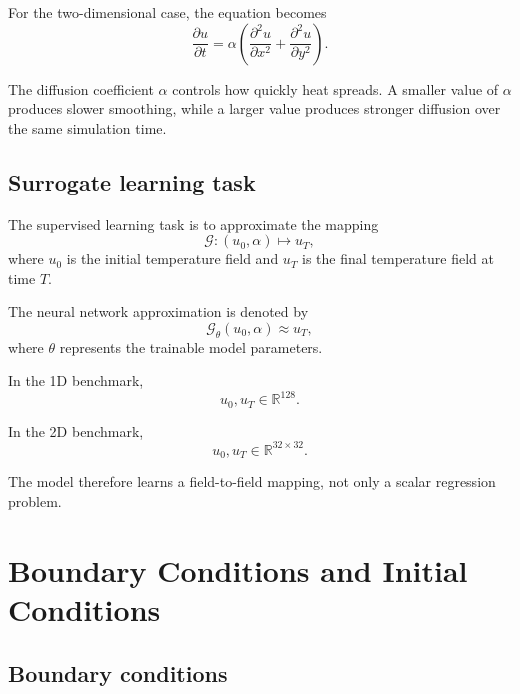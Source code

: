 \documentclass[11pt,a4paper]{article}
\begin{document}
For the two-dimensional case, the equation becomes
\begin{equation}
    \frac{\partial u}{\partial t}
    =
    \alpha
    \left(
    \frac{\partial^2 u}{\partial x^2}
    +
    \frac{\partial^2 u}{\partial y^2}
    \right).
    \label{eq:heat_2d}
\end{equation}

The diffusion coefficient \(\alpha\) controls how quickly heat spreads. A smaller value of \(\alpha\) produces slower smoothing, while a larger value produces stronger diffusion over the same simulation time.

\subsection{Surrogate learning task}

The supervised learning task is to approximate the mapping
\begin{equation}
    \mathcal{G}: (u_0, \alpha) \mapsto u_T,
    \label{eq:true_operator}
\end{equation}
where \(u_0\) is the initial temperature field and \(u_T\) is the final temperature field at time \(T\).

The neural network approximation is denoted by
\begin{equation}
    \mathcal{G}_{\theta}(u_0, \alpha) \approx u_T,
    \label{eq:learned_operator}
\end{equation}
where \(\theta\) represents the trainable model parameters.

In the 1D benchmark,
\begin{equation}
    u_0, u_T \in \mathbb{R}^{128}.
\end{equation}

In the 2D benchmark,
\begin{equation}
    u_0, u_T \in \mathbb{R}^{32 \times 32}.
\end{equation}

The model therefore learns a field-to-field mapping, not only a scalar regression problem.

\section{Boundary Conditions and Initial Conditions}

\subsection{Boundary conditions}
\end{document}
